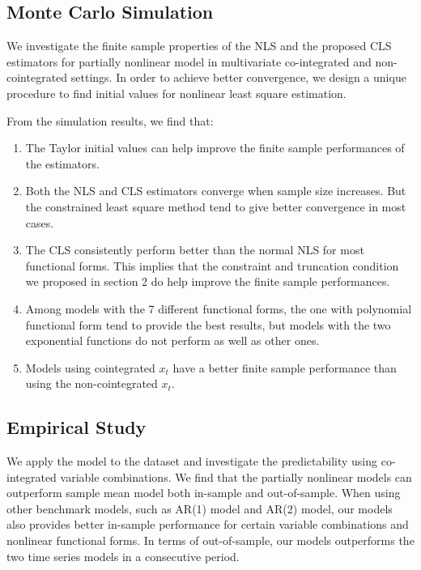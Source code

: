 \documentclass[a4paper,12pt,times,numbered,print,index]{report}
\numberwithin{equation}{section}
\begin{document}
\subsection*{Monte Carlo Simulation}
We investigate the finite sample properties of the NLS and the proposed CLS estimators
for partially nonlinear model in multivariate co-integrated and non-cointegrated settings. In order to achieve better convergence, we design a unique procedure to find initial values for nonlinear least square estimation. 

From the simulation results, we find that:
\begin{enumerate}
    \item The Taylor initial values can help improve the finite sample performances of the estimators.
    
    \item Both the NLS and CLS estimators converge when sample size increases. But the constrained least square method tend to give better convergence in most cases.
    
    \item The CLS consistently perform better than the normal NLS for most functional forms. This implies that the constraint and truncation condition we proposed in section 2 do help improve the finite sample performances. 
    
    \item Among models with the 7 different functional forms, the one with polynomial functional form tend to provide the best results, but models with the two exponential functions do not perform as well as other ones.
    
    \item Models using cointegrated $x_t$ have a better finite sample performance than using the non-cointegrated $x_t$.
\end{enumerate}

\subsection*{Empirical Study}

We apply the model to the \cite{welch2008comprehensive} dataset and investigate the predictability using co-integrated variable combinations. We find that the partially nonlinear models can outperform sample mean model both in-sample and out-of-sample. When using other benchmark models, such as AR(1) model and AR(2) model, our models also provides better in-sample performance for certain variable combinations and nonlinear functional forms. In terms of out-of-sample, our models outperforms the two time series models in a consecutive period. 
\end{document}
